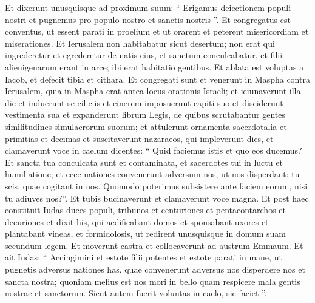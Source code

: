 \begin{biblechapter}
\begin{biblechapter}
\begin{biblechapter}
\verse Et dixerunt unusquisque ad proximum suum: “ Erigamus deiectionem populi nostri et pugnemus pro populo nostro et sanctis nostris ”. 
\verse Et congregatus est conventus, ut essent parati in proelium et ut orarent et peterent misericordiam et miserationes. 
 \verse Et Ierusalem non habitabatur sicut desertum; non erat qui ingrederetur et egrederetur de natis eius, et sanctum conculcabatur, et filii alienigenarum erant in arce; ibi erat habitatio gentibus. Et ablata est voluptas a Iacob, et defecit tibia et cithara.
 \verse Et congregati sunt et venerunt in Maspha contra Ierusalem, quia in Maspha erat antea locus orationis Israeli; 
\verse et ieiunaverunt illa die et induerunt se ciliciis et cinerem imposuerunt capiti suo et disciderunt vestimenta sua 
 \verse et expanderunt librum Legis, de quibus scrutabantur gentes similitudines simulacrorum suorum; 
\verse et attulerunt ornamenta sacerdotalia et primitias et decimas et suscitaverunt nazaraeos, qui impleverunt dies, 
\verse et clamaverunt voce in caelum dicentes: “ Quid faciemus istis et quo eos ducemus? 
\verse Et sancta tua conculcata sunt et contaminata, et sacerdotes tui in luctu et humiliatione; 
\verse et ecce nationes convenerunt adversum nos, ut nos disperdant: tu scis, quae cogitant in nos. 
\verse Quomodo poterimus subsistere ante faciem eorum, nisi tu adiuves nos?”. 
\verse Et tubis bucinaverunt et clamaverunt voce magna. 
\verse Et post haec constituit Iudas duces populi, tribunos et centuriones et pentacontarchos et decuriones 
\verse et dixit his, qui aedificabant domos et sponsabant uxores et plantabant vineas, et formidolosis, ut redirent unusquisque in domum suam secundum legem. 
\verse Et moverunt castra et collocaverunt ad austrum Emmaum. 
\verse Et ait Iudas: “ Accingimini et estote filii potentes et estote parati in mane, ut pugnetis adversus nationes has, quae convenerunt adversus nos disperdere nos et sancta nostra; 
\verse quoniam melius est nos mori in bello quam respicere mala gentis nostrae et sanctorum. 
\verse Sicut autem fuerit voluntas in caelo, sic faciet ”.
 

\end{biblechapter}
\end{biblechapter}
\end{biblechapter}
